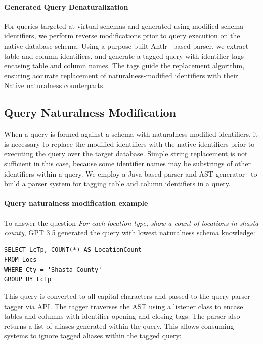 \paragraph{\textbf{Generated Query Denaturalization}}
For queries targeted at virtual schemas and generated using modified schema identifiers, we perform reverse modifications prior to query execution on the native database schema.
Using a purpose-built Antlr~\cite{Parr2014}-based parser, we extract table and column identifiers, and generate a tagged query with identifier tags encasing table and column names.
The tags guide the replacement algorithm, ensuring accurate replacement of naturalness-modified identifiers with their Native naturalness counterparts.


\subsection{Query Naturalness Modification}
\label{section:querynaturalnessmodification}

When a query is formed against a schema with naturalness-modified identifiers, it is necessary to replace the modified identifiers with the native identifiers prior to executing the query over the target database.
Simple string replacement is not sufficient in this case, because some identifier names may be substrings of other identifiers within a query.
We employ a Java-based parser and AST generator~\cite{Parr2014,antlrgrammarsv4} to build a parser system for tagging table and column identifiers in a query.

\paragraph{Query naturalness modification example}

To answer the question \emph{For each location type, show a count of locations in shasta county}, GPT 3.5 generated the query with lowest naturalness schema knowledge:

\begin{verbatim}
SELECT LcTp, COUNT(*) AS LocationCount
FROM Locs
WHERE Cty = 'Shasta County'
GROUP BY LcTp 
\end{verbatim}

This query is converted to all capital characters and passed to the query parser tagger via API.
The tagger traverses the AST using a listener class to encase tables and columns with identifier opening and closing tags. The parser also returns a list of aliases generated within the query.
This allows consuming systems to ignore tagged aliases within the tagged query:

